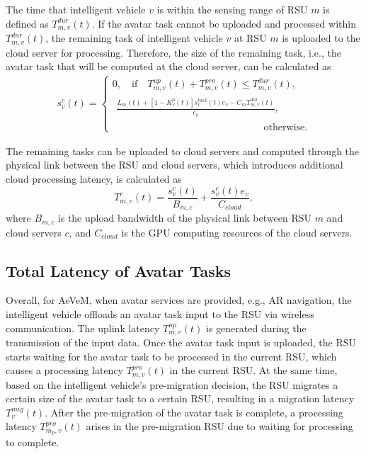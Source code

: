 \documentclass[lettersize,journal]{IEEEtran}
\begin{document}
The time that intelligent vehicle $v$ is within the sensing range of RSU $m$ is defined as $T_{m,v}^{dur}(t)$. If the avatar task cannot be uploaded and processed within $T_{m,v}^{dur}(t)$, the remaining task of intelligent vehicle $v$ at RSU $m$ is uploaded to the cloud server for processing. Therefore, the size of the remaining task, i.e., the avatar task that will be computed at the cloud server, can be calculated as
\begin{equation}
\begin{aligned}
s^{c}_{v}(t)=
\begin{cases}
0, \quad \text{if} \quad T^{up}_{m,v}(t) + T^{pro}_{m,v}(t)\leq  T_{m,v}^{dur}(t), \\
\begin{aligned}
\frac{L_m(t) + [1-K^p_v(t)] s^{task}_v(t) e_v
- C_m T_{m,v}^{dur}(t)}{e_v},
\end{aligned}  \\ \text{~~~~~~~~~~~~~~~~~~~~~~~~~~~~~~~~~~~~~~~~~~~~~~otherwise.}
\end{cases}
\end{aligned}
\end{equation}

The remaining tasks can be uploaded to cloud servers and computed through the physical link between the RSU and cloud servers, which introduces additional cloud processing latency, is calculated as
\begin{equation}
T^{c}_{m,v}(t)= \frac{s^{c}_{v}(t)}{B_{m,c}} + \frac{s^{c}_{v}(t) e_v}{C_{cloud}},\label{eq10}
\end{equation}
where $B_{m,c}$ is the upload bandwidth of the physical link between RSU $m$ and cloud servers $c$, and $C_{cloud}$ is the GPU computing resources of the cloud servers.


\subsection{Total Latency of Avatar Tasks}
Overall, for AeVeM, when avatar services are provided, e.g., AR navigation, the intelligent vehicle offloads an avatar task input to the RSU via wireless communication. The uplink latency $T^{up}_{m,v}(t)$ is generated during the transmission of the input data. Once the avatar task input is uploaded, the RSU starts waiting for the avatar task to be processed in the current RSU, which causes a processing latency $T^{pro}_{m,v}(t)$ in the current RSU. At the same time, based on the intelligent vehicle's  pre-migration decision, the RSU migrates a certain size of the avatar task to a certain RSU, resulting in a migration latency $T^{mig}_v(t)$. After the pre-migration of the avatar task is complete, a processing latency $T^{pro}_{m_{p},v}(t)$ arises in the pre-migration RSU due to waiting for processing to complete.
\end{document}
